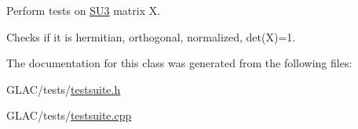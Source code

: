 Perform tests on \mbox{\hyperlink{class_s_u3}{S\+U3}} matrix X. 

Checks if it is hermitian, orthogonal, normalized, det(\+X)=1. 

The documentation for this class was generated from the following files\+:\begin{DoxyCompactItemize}
\item 
G\+L\+A\+C/tests/\mbox{\hyperlink{testsuite_8h}{testsuite.\+h}}\item 
G\+L\+A\+C/tests/\mbox{\hyperlink{testsuite_8cpp}{testsuite.\+cpp}}\end{DoxyCompactItemize}
